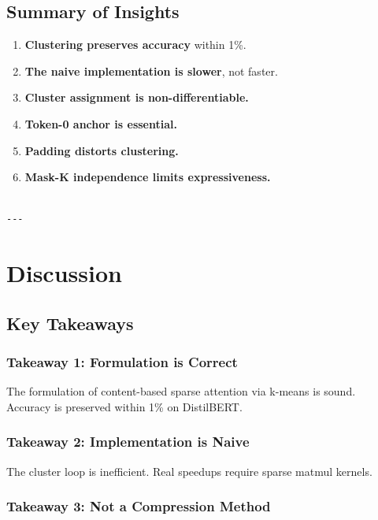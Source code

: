 \subsection{Summary of Insights}

\begin{enumerate}
\item \textbf{Clustering preserves accuracy} within 1\%.
\item \textbf{The naive implementation is slower}, not faster.
\item \textbf{Cluster assignment is non-differentiable.}
\item \textbf{Token-0 anchor is essential.}
\item \textbf{Padding distorts clustering.}
\item \textbf{Mask-K independence limits expressiveness.}
\end{enumerate}
\begin{lstlisting}

---
\end{lstlisting}


\section{Discussion}

\subsection{Key Takeaways}

\subsubsection{Takeaway 1: Formulation is Correct}

The formulation of content-based sparse attention via k-means is sound. 
Accuracy is preserved within 1\% on DistilBERT.

\subsubsection{Takeaway 2: Implementation is Naive}

The cluster loop is inefficient. Real speedups require sparse matmul kernels.

\subsubsection{Takeaway 3: Not a Compression Method}

